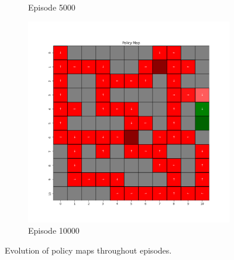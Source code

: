 \documentclass{assignment}
\begin{document}
\begin{figure}[H]
\begin{subfigure}{0.3\textwidth}
    \caption{Episode 5000}
    \end{subfigure}\hfill
    \begin{subfigure}{0.3\textwidth}
        \includegraphics[width=\textwidth]{figures/policy_q/gamma_sweep/policy_alpha_0.1_gamma_0.25_epsilon_0.2_iteration_10000.png}
    \caption{Episode 10000}
    \end{subfigure}
    \caption{Evolution of policy maps throughout episodes.}
    \label{fig:gamma_0.25_q_learning_policy}
\end{figure}
\end{document}

